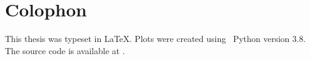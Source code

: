 \documentclass[\relativeRoot/main.tex]{subfiles}
\begin{document}
\printglossary[
    title={Abbreviations},
    type=acronym,
    style=long
]
    
\printbibliography[
    title={Bibliography},
    heading=bibintoc
]

\cleardoublepage
{}
{}
\listoffigures

\cleardoublepage
{}
{}
\listoftables

\chapter*{Colophon}
This thesis was typeset in \LaTeX. Plots were created using ~Python version 3.8. The source code is available at .
\end{document}

